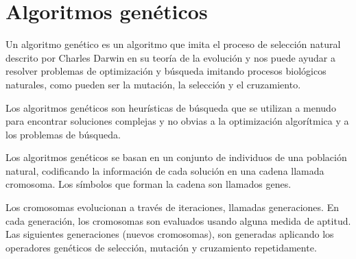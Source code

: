 \section {Algoritmos genéticos}

Un algoritmo genético es un algoritmo que imita el proceso de selección natural descrito por Charles Darwin en su teoría de la evolución y nos puede ayudar a resolver problemas de optimización y búsqueda imitando procesos biológicos naturales, como pueden ser la mutación, la selección y el cruzamiento.

\bigskip
Los algoritmos genéticos son heurísticas de búsqueda que se utilizan a menudo para encontrar soluciones complejas y no obvias a la optimización algorítmica y a los problemas de búsqueda.

\bigskip
Los algoritmos genéticos se basan en un conjunto de individuos de una población natural, codificando la información de cada solución en una cadena llamada cromosoma. Los símbolos que forman la cadena son llamados genes.

\bigskip
Los cromosomas evolucionan a través de iteraciones, llamadas generaciones. En cada generación, los cromosomas son evaluados usando alguna medida de aptitud. Las siguientes generaciones (nuevos cromosomas), son generadas aplicando los operadores genéticos de selección, mutación y cruzamiento repetidamente.


